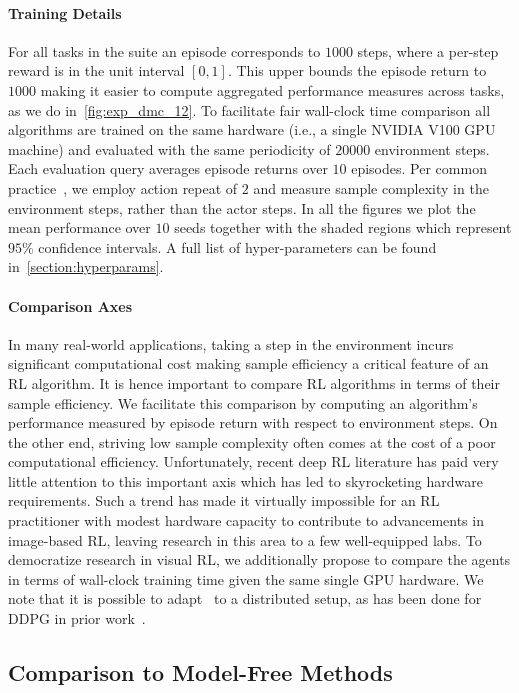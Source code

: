 \paragraph{Training Details}
For all tasks in the suite an episode corresponds to $1000$ steps, where a per-step reward is in the unit interval $[0, 1]$. This upper bounds the episode return to $1000$ making it easier to compute aggregated performance measures across tasks, as we do in~\cref{fig:exp_dmc_12}.
To facilitate fair wall-clock time comparison all algorithms are trained on the same hardware (i.e., a single NVIDIA V100 GPU machine) and evaluated with the same periodicity of $20000$ environment steps. Each evaluation query averages episode returns over $10$ episodes. Per common practice~\citep{hafner2019dream}, we employ action repeat of $2$ and measure sample complexity in the environment steps, rather than the actor steps. In all the figures we plot the mean performance over $10$ seeds together with the shaded regions which represent $95\%$ confidence intervals. A full list of hyper-parameters can be found in~\cref{section:hyperparams}.

\paragraph{Comparison Axes}
In many real-world applications, taking a step in the environment incurs significant computational cost making sample efficiency a critical feature of an RL algorithm. It is hence important to compare RL algorithms in terms of their sample efficiency. We facilitate this comparison by computing an algorithm's performance measured by episode return with respect to environment steps. On the other end, striving low sample complexity often comes at the cost of a poor computational efficiency. Unfortunately, recent deep RL literature has paid very little attention to this important axis which has led to skyrocketing hardware requirements. Such a trend has made it virtually impossible for an RL practitioner with modest hardware capacity to contribute to advancements in image-based RL, leaving research in this area to a few well-equipped labs. To democratize research in visual RL, we additionally propose to compare the agents in terms of wall-clock training time given the same single GPU hardware. We note that it is possible to adapt~\drqs{} to a distributed setup, as has been done for DDPG in prior work~\citep{barth-maron2018d4pg,hoffman2020acme}.




\subsection{Comparison to Model-Free Methods}

